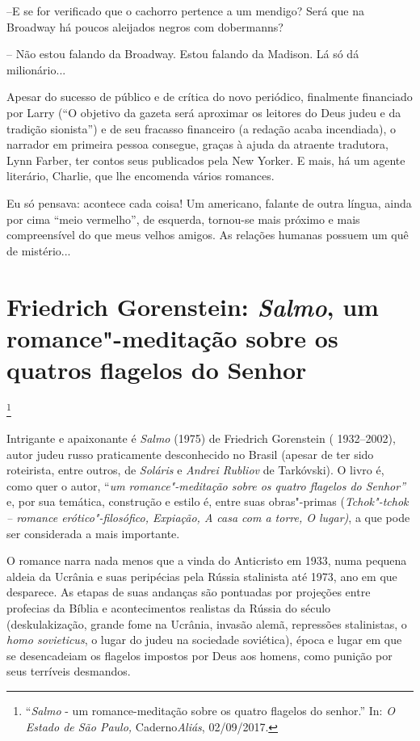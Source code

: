 --E se for verificado que o cachorro pertence a um mendigo? Será que na Broadway há poucos aleijados negros com dobermanns?

-- Não estou falando da Broadway. Estou falando da Madison. Lá só dá milionário...

Apesar do sucesso de público e de crítica do novo periódico, finalmente financiado por Larry (``O objetivo da gazeta será aproximar os leitores do Deus judeu e da tradição sionista'') e de seu fracasso financeiro (a redação acaba incendiada), o narrador em primeira pessoa consegue, graças à ajuda da atraente tradutora, Lynn Farber, ter contos seus  publicados pela New Yorker. E mais, há um agente literário, Charlie, que lhe encomenda vários romances.

Eu só pensava: acontece cada coisa! Um americano, falante de outra língua, ainda por cima “meio vermelho”, de esquerda, tornou-se mais próximo e mais compreensível do que meus velhos amigos. As relações humanas possuem um quê de mistério...

\chapter{Friedrich Gorenstein: \emph{Salmo}, um romance"-meditação sobre os quatros flagelos do Senhor}\footnote{``\emph{Salmo}
  - um romance-meditação sobre os quatro flagelos do senhor.'' In:
  \emph{O Estado de São Paulo,} Caderno\emph{Aliás}, 02/09/2017.}

Intrigante e apaixonante é \emph{Salmo} (1975) de Friedrich Gorenstein (
1932--2002), autor judeu russo praticamente desconhecido no
Brasil (apesar de ter sido roteirista, entre outros, de \emph{Soláris}
e \emph{Andrei Rubliov} de Tarkóvski). O livro é, como quer o autor,
``\emph{um romance"-meditação sobre os quatro flagelos do Senhor''} e,
por sua temática, construção e estilo é, entre suas obras"-primas
(\emph{Tchok"-tchok -- romance erótico"-filosófico, Expiação, A casa com a
torre, O lugar)}, a que pode ser considerada a mais importante.

O romance narra nada menos que a vinda do Anticristo em 1933, numa
pequena aldeia da Ucrânia e suas peripécias pela Rússia stalinista até
1973, ano em que desparece. As etapas de suas andanças são pontuadas por
projeções entre profecias da Bíblia e acontecimentos realistas da Rússia
do século  (deskulakização, grande fome na Ucrânia, invasão alemã,
repressões stalinistas, o \emph{homo sovieticus}, o lugar do judeu na
sociedade soviética), época e lugar em que se desencadeiam os flagelos
impostos por Deus aos homens, como punição por seus terríveis desmandos.

